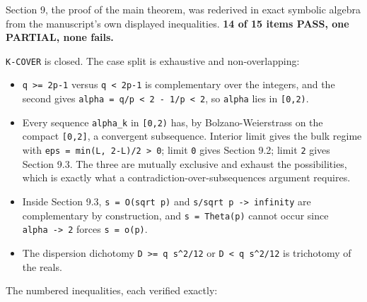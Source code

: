 \documentclass[
  10pt,
]{article}
\newcounter{none} %
\providecommand{\tightlist}{%
  \setlength{\itemsep}{0pt}\setlength{\parskip}{0pt}}
\begin{document}
Section 9, the proof of the main theorem, was rederived in exact
symbolic algebra from the manuscript's own displayed inequalities.
\textbf{14 of 15 items PASS, one PARTIAL, none fails.}

\texttt{K-COVER} is closed. The case split is exhaustive and
non-overlapping:

\begin{itemize}
\tightlist
\item
  \texttt{q\ \textgreater{}=\ 2p-1} versus \texttt{q\ \textless{}\ 2p-1}
  is complementary over the integers, and the second gives
  \texttt{alpha\ =\ q/p\ \textless{}\ 2\ -\ 1/p\ \textless{}\ 2}, so
  \texttt{alpha} lies in \texttt{{[}0,2)}.
\item
  Every sequence \texttt{alpha\_k} in \texttt{{[}0,2)} has, by
  Bolzano-Weierstrass on the compact \texttt{{[}0,2{]}}, a convergent
  subsequence. Interior limit gives the bulk regime with
  \texttt{eps\ =\ min(L,\ 2-L)/2\ \textgreater{}\ 0}; limit \texttt{0}
  gives Section 9.2; limit \texttt{2} gives Section 9.3. The three are
  mutually exclusive and exhaust the possibilities, which is exactly
  what a contradiction-over-subsequences argument requires.
\item
  Inside Section 9.3, \texttt{s\ =\ O(sqrt\ p)} and
  \texttt{s/sqrt\ p\ -\textgreater{}\ infinity} are complementary by
  construction, and \texttt{s\ =\ Theta(p)} cannot occur since
  \texttt{alpha\ -\textgreater{}\ 2} forces \texttt{s\ =\ o(p)}.
\item
  The dispersion dichotomy \texttt{D\ \textgreater{}=\ q\ s\^{}2/12} or
  \texttt{D\ \textless{}\ q\ s\^{}2/12} is trichotomy of the reals.
\end{itemize}

The numbered inequalities, each verified exactly:
\end{document}

